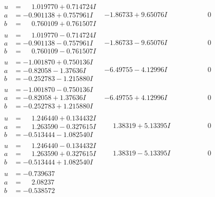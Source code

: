 \documentclass[1p]{elsarticle_modified}
\theoremstyle{definition}
\begin{document}
$$\begin{array}{c|c|c}
\begin{aligned}
u &= \phantom{-}1.019770 + 0.714724 I \\
a &= -0.901138 + 0.757961 I \\
b &= \phantom{-}0.760109 + 0.761507 I\end{aligned}
 & -1.86733 + 9.65076 I & \phantom{-0.000000 } 0 \\ \hline\begin{aligned}
u &= \phantom{-}1.019770 - 0.714724 I \\
a &= -0.901138 - 0.757961 I \\
b &= \phantom{-}0.760109 - 0.761507 I\end{aligned}
 & -1.86733 - 9.65076 I & \phantom{-0.000000 } 0 \\ \hline\begin{aligned}
u &= -1.001870 + 0.750136 I \\
a &= -0.82058 - 1.37636 I \\
b &= -0.252783 - 1.215880 I\end{aligned}
 & -6.49755 - 4.12996 I & \phantom{-0.000000 } 0 \\ \hline\begin{aligned}
u &= -1.001870 - 0.750136 I \\
a &= -0.82058 + 1.37636 I \\
b &= -0.252783 + 1.215880 I\end{aligned}
 & -6.49755 + 4.12996 I & \phantom{-0.000000 } 0 \\ \hline\begin{aligned}
u &= \phantom{-}1.246440 + 0.134432 I \\
a &= \phantom{-}1.263590 - 0.327615 I \\
b &= -0.513444 - 1.082540 I\end{aligned}
 & \phantom{-}1.38319 + 5.13395 I & \phantom{-0.000000 } 0 \\ \hline\begin{aligned}
u &= \phantom{-}1.246440 - 0.134432 I \\
a &= \phantom{-}1.263590 + 0.327615 I \\
b &= -0.513444 + 1.082540 I\end{aligned}
 & \phantom{-}1.38319 - 5.13395 I & \phantom{-0.000000 } 0 \\ \hline\begin{aligned}
u &= -0.739637\phantom{ +0.000000I} \\
a &= \phantom{-}2.08237\phantom{ +0.000000I} \\
b &= -0.538572\phantom{ +0.000000I}\end{aligned}

\end{array}$$
\end{document}
